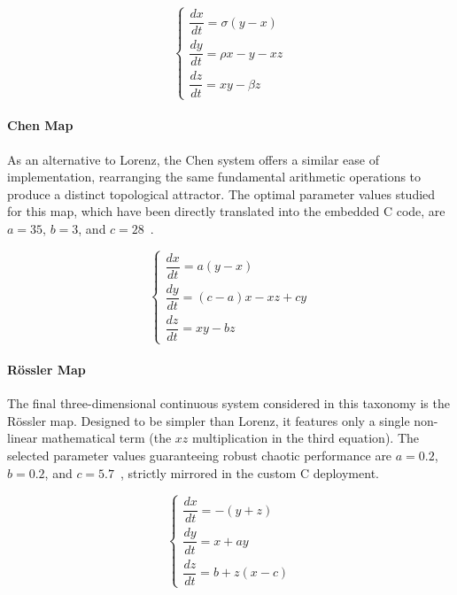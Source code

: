 \documentclass[11pt,a4paper]{report}
\begin{document}
\begin{equation}
    \begin{cases}
        \dfrac{dx}{dt} = \sigma (y - x) \\[8pt]
        \dfrac{dy}{dt} = \rho x - y - x z \\[8pt]
        \dfrac{dz}{dt} = x y - \beta z
    \end{cases}
    \label{eq:lorenz_system}
\end{equation}

\paragraph{Chen Map}
As an alternative to Lorenz, the Chen system offers a similar ease of implementation, rearranging the same fundamental arithmetic operations to produce a distinct topological attractor. 
The optimal parameter values studied for this map, which have been directly translated into the embedded C code, are $a = 35$, $b = 3$, and $c = 28$~\cite{chenDefaultParameters}.

\begin{equation}
    \begin{cases}
        \dfrac{dx}{dt} = a(y - x) \\[8pt]
        \dfrac{dy}{dt} = (c - a)x - x z + c y \\[8pt]
        \dfrac{dz}{dt} = x y - b z
    \end{cases}
    \label{eq:chen_system}
\end{equation}

\paragraph{Rössler Map}
The final three-dimensional continuous system considered in this taxonomy is the Rössler map. 
Designed to be simpler than Lorenz, it features only a single non-linear mathematical term (the $xz$ multiplication in the third equation). 
The selected parameter values guaranteeing robust chaotic performance are $a = 0.2$, $b = 0.2$, and $c = 5.7$~\cite{rosslerDefaultParameters}, strictly mirrored in the custom C deployment.

\begin{equation}
    \begin{cases}
        \dfrac{dx}{dt} = -(y + z) \\[8pt]
        \dfrac{dy}{dt} = x + a y \\[8pt]
        \dfrac{dz}{dt} = b + z(x - c)
    \end{cases}
    \label{eq:rossler_system}
\end{equation}
\end{document}
